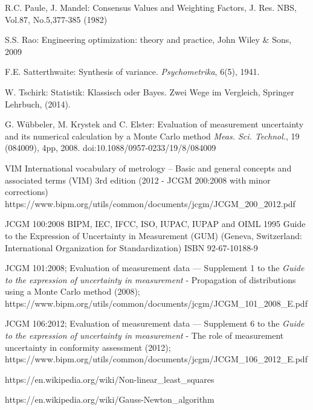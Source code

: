 \documentclass[a4paper,11pt]{book}
\begin{document}
\begin{flushleft}
\begin{thebibliography}{------}
      R.C. Paule, J. Mandel: Consensus Values and Weighting Factors, J. Res. NBS, Vol.87, No.5,377-385 (1982)

     S.S. Rao: Engineering optimization: theory and practice,
    John Wiley \& Sons, 2009

     F.E. Satterthwaite: Synthesis of variance. {\em Psychometrika}, 6(5), 1941.

     W. Tschirk: Statistik: Klassisch oder Bayes. Zwei Wege im Vergleich, Springer Lehrbuch, (2014).

     G. Wübbeler, M. Krystek and C. Elster: Evaluation of measurement uncertainty
    and its numerical calculation by a Monte Carlo method
    {\em Meas. Sci. Technol.}, 19 (084009), 4pp, 2008.
    doi:10.1088/0957-0233/19/8/084009


     VIM International vocabulary of metrology – Basic and general
     concepts and associated terms (VIM) 3rd edition (2012 - JCGM 200:2008 with minor corrections)
     \newline https://www.bipm.org/utils/common/documents/jcgm/JCGM\_200\_2012.pdf

     JCGM 100:2008 BIPM, IEC, IFCC, ISO, IUPAC, IUPAP and OIML 1995 Guide to the Expression of Uncertainty in Measurement (GUM)
    (Geneva, Switzerland: International Organization for
    Standardization) ISBN 92-67-10188-9

    JCGM 101:2008; Evaluation of measurement data — Supplement 1 to the
    \textsl{Guide to the expression of uncertainty in measurement} -
    Propagation of distributions using a Monte Carlo method (2008); \newline
    https://www.bipm.org/utils/common/documents/jcgm/JCGM\_101\_2008\_E.pdf

    JCGM 106:2012; Evaluation of measurement data — Supplement 6 to the
    \textsl{Guide to the expression of uncertainty in measurement} -
    The role of measurement uncertainty in conformity assessment (2012); \newline
    https://www.bipm.org/utils/common/documents/jcgm/JCGM\_106\_2012\_E.pdf

     https://en.wikipedia.org/wiki/Non-linear\_least\_squares

     https://en.wikipedia.org/wiki/Gauss-Newton\_algorithm


\end{thebibliography}
\end{flushleft}
\end{document}
